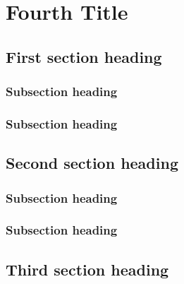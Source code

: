 \chapter[\DTMusedate{entry}]{Fourth Title}

\section{First section heading}
\marginnote{\lipsum[1][2-4]}
\lipsum[1]

\subsection{Subsection heading}
\lipsum[2]

\marginnote{\lipsum[1][2-4]}

\lipsum[1]

\marginnote{\lipsum[1][2-4]}

\subsection{Subsection heading}
\lipsum[1-2]

\section{Second section heading}
\lipsum[3-5]

\subsection{Subsection heading}
\lipsum[1-2]

\subsection{Subsection heading}
\lipsum[1]

\marginnote{\lipsum[1][2-4]}

\lipsum[1]

\section{Third section heading}
\lipsum[2 - 3]